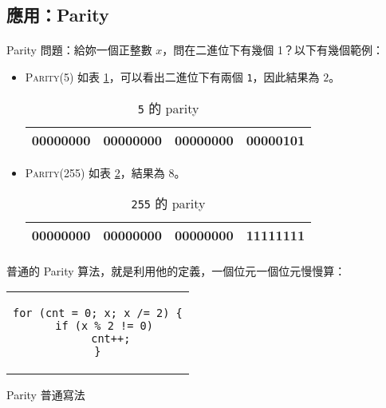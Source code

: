\documentclass[12pt,a4paper,oneside]{report}
\begin{document}
\begin{CJK}{UTF8}{bkai}
\subsection{應用：Parity}

\paragraph{}Parity 問題：給妳一個正整數 $x$，問在二進位下有幾個 1？以下有幾個範例：

\begin{itemize}
\item \textsc{Parity(5)} 如表 \ref{basic:cpp:table:parity:5}，可以看出二進位下有兩個 \lstinline!1!，因此結果為 $2$。
\begin{table}[h!]
\centering
\begin{tabular}{|c|c|c|c|}
\hline
00000000 & 00000000 & 00000000 & 00000{\color{red}1}0{\color{red}1}\\
\hline
\end{tabular}
\caption{\lstinline!5! 的 parity}
\label{basic:cpp:table:parity:5}
\end{table}

\item \textsc{Parity(255)} 如表 \ref{basic:cpp:table:parity:255}，結果為 $8$。
\begin{table}[h!]
\centering
\begin{tabular}{|c|c|c|c|}
\hline
00000000 & 00000000 & 00000000 & {\color{red}11111111}\\
\hline
\end{tabular}
\caption{\lstinline!255! 的 parity}
\label{basic:cpp:table:parity:255}
\end{table}

\end{itemize}

\paragraph{}普通的 Parity 算法，就是利用他的定義，一個位元一個位元慢慢算：

\begin{code}[h!]
\centering
\begin{tabular}{c}
\begin{lstlisting}
for (cnt = 0; x; x /= 2) {
  if (x % 2 != 0)
    cnt++;
}
\end{lstlisting}
\end{tabular}
\caption{Parity 普通寫法}
\label{basic:cpp:code:parity:naive}
\end{code}


\end{CJK}
\end{document}
